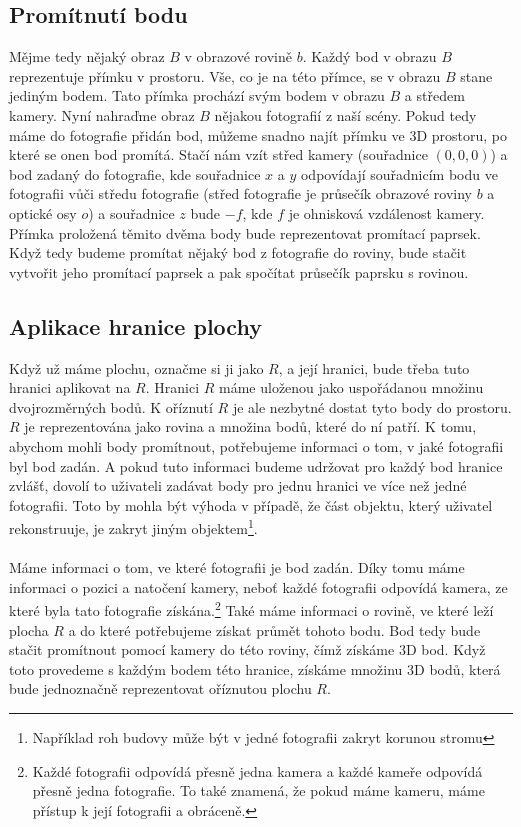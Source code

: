 \documentclass[11pt,twoside,a4paper]{book}
\begin{document}
\subsection{Promítnutí bodu}
Mějme tedy nějaký obraz $B$ v obrazové rovině $b$. Každý bod v obrazu $B$ reprezentuje přímku v prostoru. Vše, co je na této přímce, se v obrazu $B$ stane jediným bodem. Tato přímka prochází svým bodem v obrazu $B$ a středem kamery. Nyní nahraďme obraz $B$ nějakou fotografií z naší scény. Pokud tedy máme do fotografie přidán bod, můžeme snadno najít přímku ve 3D prostoru, po které se onen bod promítá. Stačí nám vzít střed kamery (souřadnice $(0,0,0)$) a bod zadaný do fotografie, kde souřadnice $x$ a $y$ odpovídají souřadnicím bodu ve fotografii vůči středu fotografie (střed fotografie je průsečík obrazové roviny $b$ a optické osy $o$) a souřadnice $z$ bude $-f$, kde $f$ je ohnisková vzdálenost kamery.  Přímka proložená těmito dvěma body bude reprezentovat promítací paprsek. Když tedy budeme promítat nějaký bod z fotografie do roviny, bude stačit vytvořit jeho promítací paprsek a pak spočítat průsečík paprsku s rovinou.

\subsection{Aplikace hranice plochy}
Když už máme plochu, označme si ji jako $R$, a její hranici, bude třeba tuto hranici aplikovat na $R$. Hranici $R$ máme uloženou jako uspořádanou množinu dvojrozměrných bodů. K oříznutí $R$ je ale nezbytné dostat tyto body do prostoru. $R$ je reprezentována jako rovina a množina bodů, které do ní patří. K tomu, abychom mohli body promítnout, potřebujeme informaci o tom, v jaké fotografii byl bod zadán. A pokud tuto informaci budeme udržovat pro každý bod hranice zvlášť, dovolí to uživateli zadávat body pro jednu hranici ve více než jedné fotografii. Toto by mohla být výhoda v případě, že část objektu, který uživatel rekonstruuje, je zakryt jiným objektem\footnote{Například roh budovy může být v jedné fotografii zakryt korunou stromu}.
\paragraph{}
Máme informaci o tom, ve které fotografii je bod zadán. Díky tomu máme informaci o pozici a natočení kamery, neboť každé fotografii odpovídá kamera, ze které byla tato fotografie získána.\footnote{Každé fotografii odpovídá přesně jedna kamera a každé kameře odpovídá přesně jedna fotografie. To také znamená, že pokud máme kameru, máme přístup k její fotografii a obráceně.} Také máme informaci o rovině, ve které leží plocha $R$ a do které potřebujeme získat průmět tohoto bodu. Bod tedy bude stačit promítnout pomocí kamery do této roviny, čímž získáme 3D bod. Když toto provedeme s každým bodem této hranice, získáme množinu 3D bodů, která bude jednoznačně reprezentovat oříznutou plochu $R$.
\end{document}
